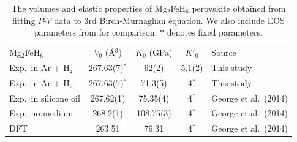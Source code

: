\documentclass[draft,jgrga,12pt]{agujournal2019}
\begin{document}
\begin{table}[!bh]
\centering
\caption{The volumes and elastic properties of Mg$_2$FeH$_6$ perovskite obtained from fitting $P$-$V$ data to 3rd Birch-Murnaghan equation. We also include EOS parameters from  for comparison. 
$*$ denotes fixed parameters. }\label{bulk-params}
\renewcommand{\arraystretch}{1.1}
\setlength{\arrayrulewidth}{1.5pt}
\begin{tabular}{l
                S[table-format=3.2(2)]
                S[table-format=3.2(2)]
                S[table-format=1.1(1)]
                l}
\hline
Mg$_2$FeH$_6$ & {$V_0$ (\AA$^3$)} & {$K_0$ (GPa)} & {$K'_0$} & {Source} \\
Exp.\ in Ar + H$_2$        & {267.63(7)$^*$} & 62(2)   & 5.1(2) & This study \\
Exp.\ in Ar + H$_2$        & {267.63(7)$^*$} & 71.3(5) & {4$^{*}$}& This study\\
Exp.\ in silicone oil       & 267.62(1) & 75.35(4)& {4$^{*}$}    & George et al.\ (2014) \\
Exp.\ no medium             & 268.2(1)  & 108.75(3)& {4$^{*}$}  & George et al.\ (2014) \\
DFT                        & 263.51    & 76.31   & {4$^{*}$}   & George et al.\ (2014) \\
\hline
\end{tabular}
\end{table}


\end{document}
